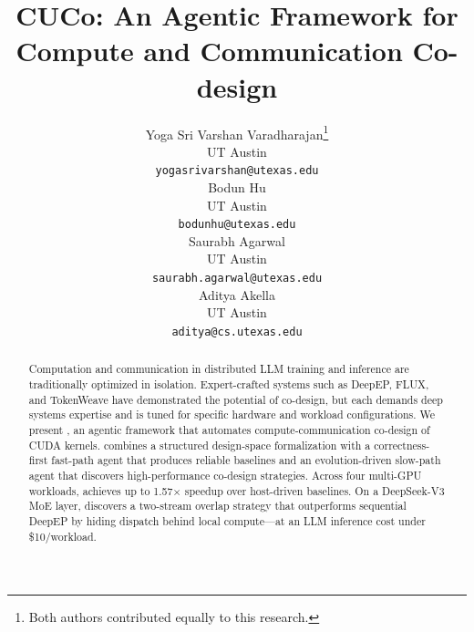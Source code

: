 \documentclass{article}
\title{CUCo: An Agentic Framework for Compute and Communication Co-design}
\author{%
  Yoga Sri Varshan Varadharajan\thanks{Both authors contributed equally to this research.} \\
  UT Austin \\
  \texttt{yogasrivarshan@utexas.edu} \\
  \And
  Bodun Hu\footnotemark[1] \\
  UT Austin \\
  \texttt{bodunhu@utexas.edu} \\
  \And
  Saurabh Agarwal \\
  UT Austin \\
  \texttt{saurabh.agarwal@utexas.edu} \\
  \And
  Aditya Akella \\
  UT Austin \\
  \texttt{aditya@cs.utexas.edu} \\
}
\begin{document}
\maketitle

\begin{abstract}
Computation and communication in distributed LLM training and inference are traditionally optimized in isolation. Expert-crafted systems such as DeepEP, FLUX, and TokenWeave have demonstrated the potential of co-design, but each demands deep systems expertise and is tuned for specific hardware and workload configurations. We present \cufuse{}, an agentic framework that automates compute-communication co-design of CUDA kernels. \cufuse{} combines a structured design-space formalization with a correctness-first fast-path agent that produces reliable baselines and an evolution-driven slow-path agent that discovers high-performance co-design strategies. Across four multi-GPU workloads, \cufuse{} achieves up to 1.57$\times$ speedup over host-driven baselines. On a DeepSeek-V3 MoE layer, \cufuse{} discovers a two-stream overlap strategy that outperforms sequential DeepEP by hiding dispatch behind local compute---at an LLM inference cost under \$10/workload.\end{abstract}










\appendix


\newpage

\end{document}
